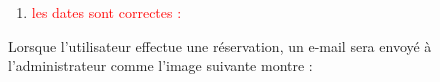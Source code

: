 \documentclass{article}
\begin{document}
\begin{enumerate}
\begin{enumerate}
               \noindent{}          
          
          
          
          
          
               
  \item \textcolor{red}{les dates sont correctes :} 
  \vspace{0.3cm}
               \hspace*{-0.7in}

               \noindent{}
  
\end{enumerate}  

Lorsque l'utilisateur effectue une réservation, un e-mail sera envoyé à l'administrateur comme l'image suivante montre :

\vspace{0.7cm}
               \hspace*{-0.7in}


\end{enumerate}
\end{document}

